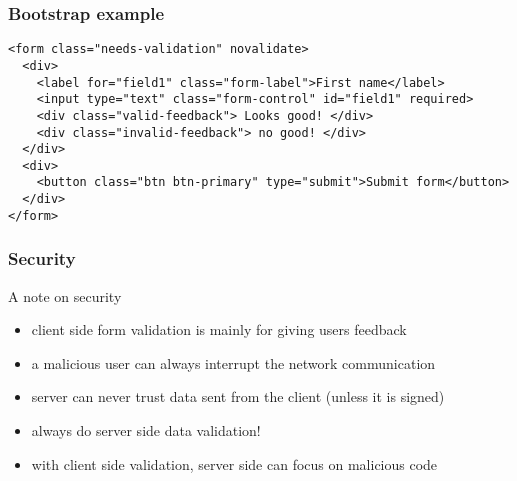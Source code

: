 \begin{frame}[fragile] \frametitle{Bootstrap example}
\begin{lstlisting}[style=htmlcssjs]
<form class="needs-validation" novalidate>
  <div>
    <label for="field1" class="form-label">First name</label>
    <input type="text" class="form-control" id="field1" required>
    <div class="valid-feedback"> Looks good! </div>
    <div class="invalid-feedback"> no good! </div>
  </div>
  <div>
    <button class="btn btn-primary" type="submit">Submit form</button>
  </div>
</form>
\end{lstlisting}
\end{frame}
\begin{frame}[fragile] \frametitle{Security}
A note on security
\begin{itemize}
  \item client side form validation is mainly for giving users feedback
  \item a malicious user can always interrupt the network communication
  \item server can never trust data sent from the client (unless it is signed)
  \item always do server side data validation!
  \item with client side validation, server side can focus on malicious code
\end{itemize}
\end{frame}

